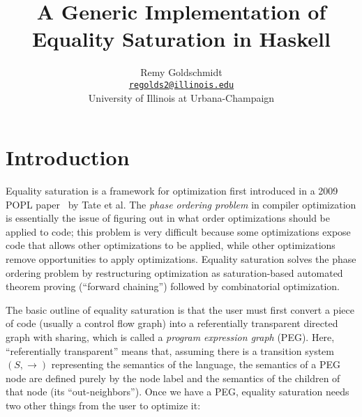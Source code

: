 \documentclass[11pt]{report}
\newcommand{\email}[1]{\href{mailto:#1}{\texttt{#1}}}
\begin{document}
\title{A Generic Implementation of Equality Saturation in Haskell}
\author{%
  Remy Goldschmidt \\
  \email{regolds2@illinois.edu} \\
  University of Illinois at Urbana-Champaign
}

\maketitle

\tableofcontents


\chapter{Introduction}

Equality saturation is a framework for optimization first introduced in
a 2009 POPL paper~\cite{tate-2009} by Tate et al.
The \textit{phase ordering problem} in compiler optimization is essentially
the issue of figuring out in what order optimizations should be applied to code;
this problem is very difficult because some optimizations expose code that
allows other optimizations to be applied, while other optimizations remove
opportunities to apply optimizations. Equality saturation solves the phase
ordering problem by restructuring optimization as saturation-based automated
theorem proving (``forward chaining'') followed by combinatorial optimization.

The basic outline of equality saturation is that the user must first convert
a piece of code (usually a control flow graph) into a referentially transparent
directed graph with sharing, which is called a \textit{program expression graph}
(PEG)\footnotemark. Here, ``referentially transparent'' means that, assuming
there is a transition system $(S, {\to})$ representing the semantics of the
language, the semantics of a PEG node are defined purely by the node label and
the semantics of the children of that node (its ``out-neighbors''). Once we have
a PEG, equality saturation needs two other things from the user to optimize it:

\end{document}
